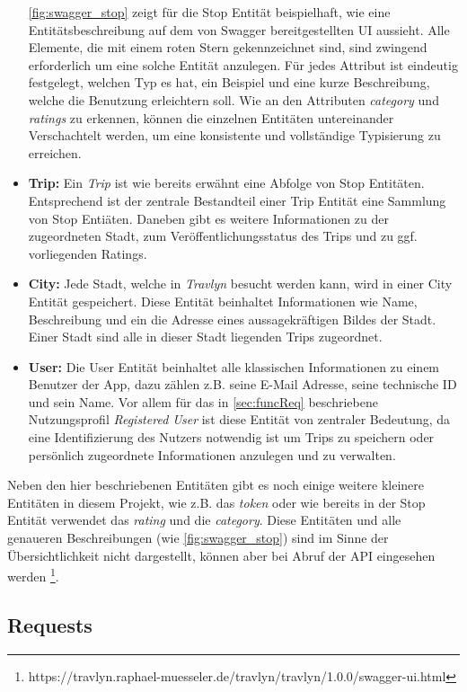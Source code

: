 \begin{itemize}
		\autoref{fig:swagger_stop} zeigt für die Stop Entität beispielhaft, wie eine Entitätsbeschreibung auf dem von Swagger bereitgestellten UI aussieht. Alle Elemente, die mit einem roten Stern gekennzeichnet sind, sind zwingend erforderlich um eine solche Entität anzulegen. Für jedes Attribut ist eindeutig festgelegt, welchen Typ es hat, ein Beispiel und eine kurze Beschreibung, welche die Benutzung erleichtern soll. Wie an den Attributen \textit{category} und \textit{ratings} zu erkennen, können die einzelnen Entitäten untereinander Verschachtelt werden, um eine konsistente und vollständige Typisierung zu erreichen.   
		\item \textbf{Trip:} Ein \textit{Trip} ist wie bereits erwähnt eine Abfolge von Stop Entitäten. Entsprechend ist der zentrale Bestandteil einer Trip Entität eine Sammlung von Stop Entiäten. Daneben gibt es weitere Informationen zu der zugeordneten Stadt, zum Veröffentlichungsstatus des Trips und zu ggf. vorliegenden Ratings.
		\item \textbf{City:} Jede Stadt, welche in \textit{Travlyn} besucht werden kann, wird in einer City Entität gespeichert. Diese Entität beinhaltet Informationen wie Name, Beschreibung und ein die Adresse eines aussagekräftigen Bildes der Stadt. Einer Stadt sind alle in dieser Stadt liegenden Trips zugeordnet. 
		\item \textbf{User:} Die User Entität beinhaltet alle klassischen Informationen zu einem Benutzer der App, dazu zählen z.B. seine E-Mail Adresse, seine technische ID und sein Name. Vor allem für das in  \autoref{sec:funcReq} beschriebene Nutzungsprofil \textit{Registered User} ist diese Entität von zentraler Bedeutung, da eine Identifizierung des Nutzers notwendig ist um Trips zu speichern oder persönlich zugeordnete Informationen anzulegen und zu verwalten.
	\end{itemize}

	Neben den hier beschriebenen Entitäten gibt es noch einige weitere kleinere Entitäten in diesem Projekt, wie z.B. das \textit{token} oder wie bereits in der Stop Entität verwendet das \textit{rating} und die \textit{category}. Diese Entitäten und alle genaueren Beschreibungen (wie \autoref{fig:swagger_stop}) sind im Sinne der Übersichtlichkeit nicht dargestellt, können aber bei Abruf der API eingesehen werden \footnote{https://travlyn.raphael-muesseler.de/travlyn/travlyn/1.0.0/swagger-ui.html}.
	
	\subsection{Requests}
	\label{sec:konzept.kommunikation.requests}
	
